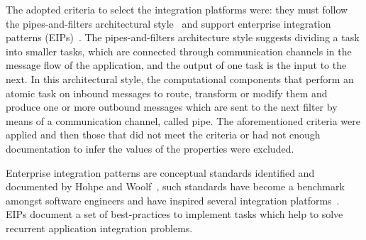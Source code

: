 The adopted criteria to select the integration platforms were: they must follow the pipes-and-filters architectural style~\cite{alexander1977} and support enterprise integration patterns (EIPs)~\cite{hohpe2004}.
The pipes-and-filters architecture style suggests dividing a task into smaller tasks, which are connected through communication channels in the message flow of the application, and the output of one task is the input to the next. In this architectural style, the computational components that perform an atomic task on inbound messages to route, transform or modify them and produce one or more outbound messages which are sent to the next filter by means of a communication channel, called pipe. The aforementioned criteria were applied and then those that did not meet the criteria or had not enough documentation to infer the values of the properties were excluded.

Enterprise integration patterns are conceptual standards identified and documented by Hohpe and Woolf~\cite{hohpe2004}, such standards have become a benchmark amongst software engineers and have inspired several integration platforms~\cite{isen2010,dossot2014,fisher2012,frantz2012}. EIPs document a set of best-practices to implement tasks which help to solve recurrent application integration problems.

